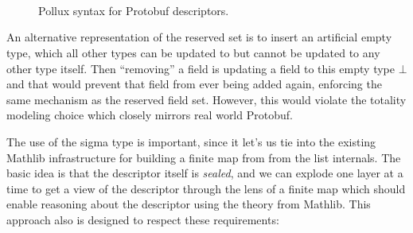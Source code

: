 \begin{figure}[H]
  \centering
  \begin{syntax}

    
    \alternative{\double}
    \alternative{\float}
    \alternative{\ints}
    \alternative{\intl} \\
    \alternative{\uints}
    \alternative{\uintl}
    \alternative{\sints}
    \alternative{\sintl} \\
    \alternative{\fixeds}
    \alternative{\fixedl}
    \alternative{\sfixeds}
    \alternative{\sfixedl} \\
    \alternative{\bool}
    \alternative{\String}
    \alternative{\byt}

    \alternative{\nm}

    \category[Cardinality]{\card}
    \alternative{\sig}
    \alternative{\opt}
    \alternative{\rep}

    \category[Field]{\fd}
    \alternative{\field{\card}{\ty}}

    \alternative{\nil}

    \alternative{\nil}

    \category[Descriptor]{\dc}
  \end{syntax}
  \caption{Pollux syntax for Protobuf descriptors.}\label{fig:proto-desc-syn}
\end{figure}

An alternative representation of the reserved set is to insert an artificial
empty type, which all other types can be updated to but cannot be updated to any
other type itself. Then ``removing'' a field is updating a field to this empty
type $\bot$ and that would prevent that field from ever being added again,
enforcing the same mechanism as the reserved field set. However, this would
violate the totality modeling choice which closely mirrors real world Protobuf.

The use of the sigma type is important, since it let's us tie into the existing
Mathlib infrastructure for building a finite map from from the list
internals. The basic idea is that the descriptor itself is \emph{sealed}, and we
can explode one layer at a time to get a view of the descriptor through the lens
of a finite map which should enable reasoning about the descriptor using the
theory from Mathlib. This approach also is designed to respect these
requirements:


